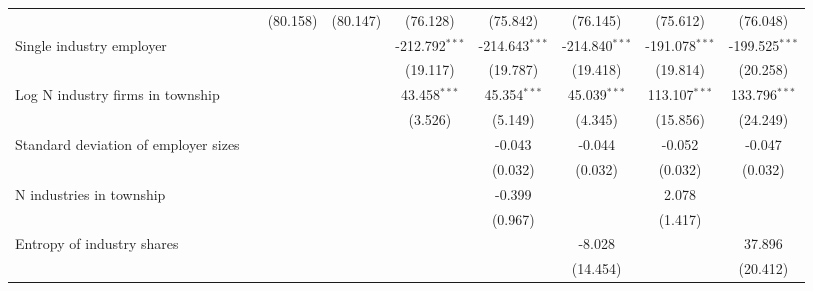 \begin{tabular}{lcccccccc}
                                                         &                 & (80.158)        & (80.147)        & (76.128)         & (75.842)         & (76.145)         & (75.612)         & (76.048)\\   
   Single industry employer                              &                 &                 &                 & -212.792$^{***}$ & -214.643$^{***}$ & -214.840$^{***}$ & -191.078$^{***}$ & -199.525$^{***}$\\   
                                                         &                 &                 &                 & (19.117)         & (19.787)         & (19.418)         & (19.814)         & (20.258)\\   
   Log N industry firms in township                      &                 &                 &                 & 43.458$^{***}$   & 45.354$^{***}$   & 45.039$^{***}$   & 113.107$^{***}$  & 133.796$^{***}$\\   
                                                         &                 &                 &                 & (3.526)          & (5.149)          & (4.345)          & (15.856)         & (24.249)\\   
   Standard deviation of employer sizes                  &                 &                 &                 &                  & -0.043           & -0.044           & -0.052           & -0.047\\   
                                                         &                 &                 &                 &                  & (0.032)          & (0.032)          & (0.032)          & (0.032)\\   
   N industries in township                              &                 &                 &                 &                  & -0.399           &                  & 2.078            &   \\   
                                                         &                 &                 &                 &                  & (0.967)          &                  & (1.417)          &   \\   
   Entropy of industry shares                            &                 &                 &                 &                  &                  & -8.028           &                  & 37.896\\   
                                                         &                 &                 &                 &                  &                  & (14.454)         &                  & (20.412)\\   

\end{tabular}
